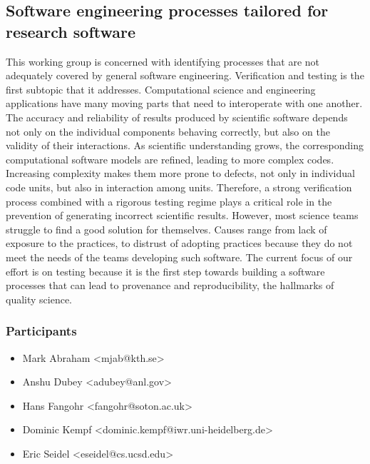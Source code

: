 \subsection{Software engineering processes tailored for research software}
\label{sec:soft-eng}


This working group is concerned with identifying processes that are not adequately
covered by general software engineering. Verification and testing is
the first subtopic that it addresses.
Computational science and engineering applications have many moving
parts that need to interoperate with one another. The accuracy and
reliability of results produced by scientific software depends not
only on the individual components behaving correctly, but also on the
validity of their interactions.
As scientific understanding grows,
the corresponding computational software models are refined, leading
to more complex codes. Increasing complexity makes them more prone to
defects, not only in individual code units, but also in interaction
among units. Therefore, a strong verification process combined with a
rigorous testing regime plays a critical role in the prevention of
generating incorrect scientific results. However, most science teams
struggle to find a good solution for themselves. Causes range from
lack of exposure to the practices, to distrust of adopting practices
because they do not meet the needs of the teams developing such
software.  The current focus of our effort is on testing because it is the first step
towards building a software processes that can lead to provenance and
reproducibility, the hallmarks of quality science.

\subsubsection{Participants}
\begin{itemize}
\item Mark Abraham <mjab@kth.se>
\item Anshu Dubey <adubey@anl.gov>
\item Hans Fangohr <fangohr@soton.ac.uk>
\item Dominic Kempf <dominic.kempf@iwr.uni-heidelberg.de>
\item Eric Seidel <eseidel@cs.ucsd.edu>
\end{itemize}

